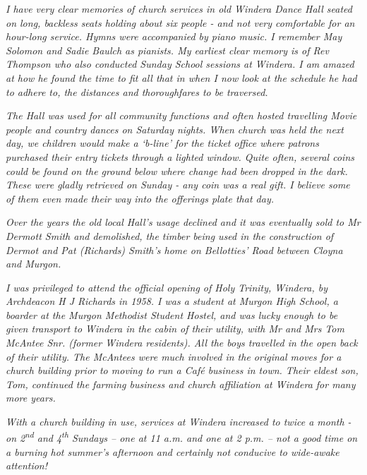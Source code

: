 \emph{I have very clear memories of church services in old Windera Dance Hall seated on long, backless seats holding about six people - and not very comfortable for an hour-long service. Hymns were accompanied by piano music. I remember May Solomon and Sadie Baulch as pianists. My earliest clear memory is of Rev Thompson who also conducted Sunday School sessions at Windera. I am amazed at how he found the time to fit all that in when I now look at the schedule he had to adhere to, the distances and thoroughfares to be traversed.}



\emph{The Hall was used for all community functions and often hosted travelling Movie people and country dances on Saturday nights. When church was held the next day, we children would make a `b-line' for the ticket office where patrons purchased their entry tickets through a lighted window. Quite often, several coins could be found on the ground below where change had been dropped in the dark. These were gladly retrieved on Sunday - any coin was a real gift. I believe some of them even made their way into the offerings plate that day.}



\emph{Over the years the old local Hall's usage declined and it was eventually sold to Mr Dermott Smith and demolished, the timber being used in the construction of Dermot and Pat (Richards) Smith's home on Bellotties' Road between Cloyna and Murgon.}



\emph{I was privileged to attend the official opening of Holy Trinity, Windera, by Archdeacon H J Richards in 1958. I was a student at Murgon High School, a boarder at the Murgon Methodist Student Hostel, and was lucky enough to be given transport to Windera in the cabin of their utility, with Mr and Mrs Tom McAntee Snr. (former Windera residents). All the boys travelled in the open back of their utility. The McAntees were much involved in the original moves for a church building prior to moving to run a Café business in town. Their eldest son, Tom, continued the farming business and church affiliation at Windera for many more years.}



\emph{With a church building in use, services at Windera increased to twice a month - on 2\textsuperscript{nd} and 4\textsuperscript{th} Sundays -- one at 11 a.m. and one at 2 p.m. -- not a good time on a burning hot summer's afternoon and certainly not conducive to wide-awake attention!}



